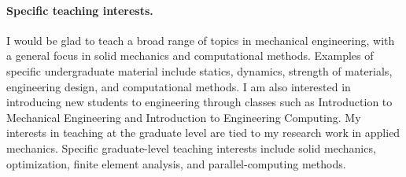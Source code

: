 \documentclass[11pt]{article}
\begin{document}



\paragraph{Specific teaching interests.}  I would be glad to teach a broad range of topics in mechanical engineering, with a general focus in solid mechanics and computational methods.  Examples of specific undergraduate material include statics, dynamics, strength of materials, engineering design, and computational methods.  I am also interested in introducing new students to engineering through classes such as Introduction to Mechanical Engineering and Introduction to Engineering Computing.  My interests in teaching at the graduate level are tied to my research work in applied mechanics.  Specific graduate-level teaching interests include solid mechanics, optimization, finite element analysis, and parallel-computing methods.
\end{document}
